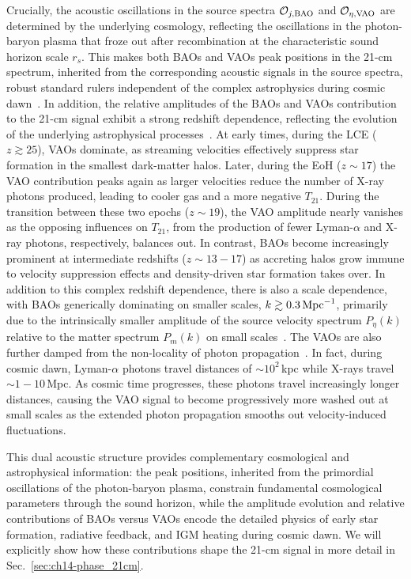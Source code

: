 Crucially, the acoustic oscillations in the source spectra $\mathcal{O}_{j,\rm BAO}$ and $\mathcal{O}_{\eta,\rm VAO}$ are determined by the underlying cosmology, reflecting the oscillations in the photon-baryon plasma that froze out after recombination at the characteristic sound horizon scale $r_s$. This makes both BAOs and VAOs peak positions in the 21-cm spectrum, inherited from the corresponding acoustic signals in the source spectra, robust standard rulers independent of the complex astrophysics during cosmic dawn~\cite{wyithe08, wyithe08b, loeb08, chang08, seo10, munoz19b, Sarkar:2022mdz}. In addition, the relative amplitudes of the BAOs and VAOs contribution to the 21-cm signal exhibit a strong redshift dependence, reflecting the evolution of the underlying astrophysical processes~\cite{munoz20,Hotinli:2021vxg,Libanore:2023oxf, cruz24,Zhang:2024pwv, verwohlt2024}. At early times, during the LCE ($z\gtrsim 25$), VAOs dominate, as streaming velocities effectively suppress star formation in the smallest dark-matter halos. Later, during the EoH ($z\sim 17$) the VAO contribution peaks again as larger velocities reduce the number of X-ray photons produced, leading to cooler gas and a more negative $T_{21}$. During the transition between these two epochs ($z\sim 19$), the VAO amplitude nearly vanishes as the opposing influences on $T_{21}$, from the production of fewer Lyman-$\alpha$ and X-ray photons, respectively, balances out. In contrast, BAOs become increasingly prominent at intermediate redshifts ($z\sim 13-17$) as accreting halos grow immune to velocity suppression effects and density-driven star formation takes over. In addition to this complex redshift dependence, there is also a scale dependence, with BAOs generically dominating on smaller scales, $k\gtrsim 0.3\,{\rm Mpc}^{-1}$, primarily due to the intrinsically smaller amplitude of the source velocity spectrum $P_\eta(k)$ relative to the matter spectrum $P_m(k)$ on small scales~\citep{cruz25}. The VAOs are also further damped from the non-locality of photon propagation~\cite{munoz19,Cruz:2024fsv}. In fact, during cosmic dawn, Lyman-$\alpha$ photons travel distances of $\sim 10^2\,$kpc while X-rays travel $\sim 1-10\,$Mpc. As cosmic time progresses, these photons travel increasingly longer distances, causing the VAO signal to become progressively more washed out at small scales as the extended photon propagation smooths out velocity-induced fluctuations.

This dual acoustic structure provides complementary cosmological and astrophysical information: the peak positions, inherited from the primordial oscillations of the photon-baryon plasma, constrain fundamental cosmological parameters through the sound horizon, while the amplitude evolution and relative contributions of BAOs versus VAOs encode the detailed physics of early star formation, radiative feedback, and IGM heating during cosmic dawn. We will explicitly show how these contributions shape the 21-cm signal in more detail in Sec.~\ref{sec:ch14-phase_21cm}.

